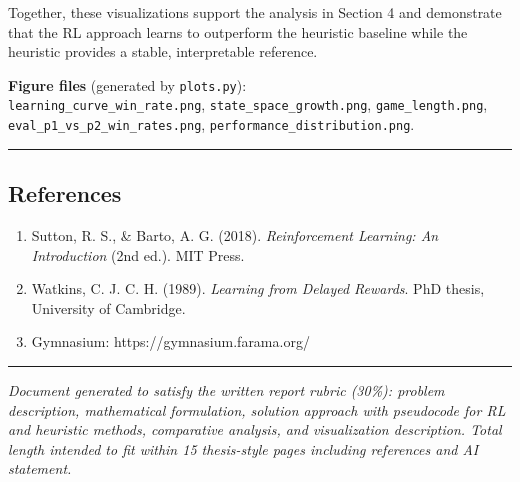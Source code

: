 \documentclass[
]{article}
\providecommand{\tightlist}{%
  \setlength{\itemsep}{0pt}\setlength{\parskip}{0pt}}
\begin{document}
Together, these visualizations support the analysis in Section 4 and
demonstrate that the RL approach learns to outperform the heuristic
baseline while the heuristic provides a stable, interpretable reference.

\textbf{Figure files} (generated by \texttt{plots.py}):\\
\texttt{learning\_curve\_win\_rate.png},
\texttt{state\_space\_growth.png}, \texttt{game\_length.png},
\texttt{eval\_p1\_vs\_p2\_win\_rates.png},
\texttt{performance\_distribution.png}.

\begin{center}\rule{0.5\linewidth}{0.5pt}\end{center}

\subsection{References}\label{references}

\begin{enumerate}
\def\labelenumi{\arabic{enumi}.}
\tightlist
\item
  Sutton, R. S., \& Barto, A. G. (2018). \emph{Reinforcement Learning:
  An Introduction} (2nd ed.). MIT Press.\\
\item
  Watkins, C. J. C. H. (1989). \emph{Learning from Delayed Rewards}. PhD
  thesis, University of Cambridge.\\
\item
  Gymnasium: https://gymnasium.farama.org/
\end{enumerate}

\begin{center}\rule{0.5\linewidth}{0.5pt}\end{center}

\emph{Document generated to satisfy the written report rubric (30\%):
problem description, mathematical formulation, solution approach with
pseudocode for RL and heuristic methods, comparative analysis, and
visualization description. Total length intended to fit within 15
thesis-style pages including references and AI statement.}
\end{document}
